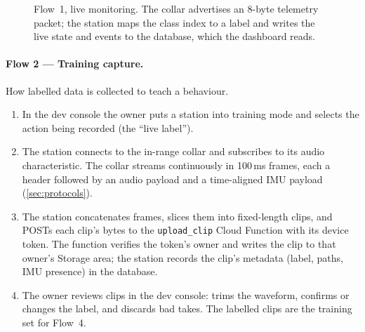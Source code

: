 \begin{figure}[ht]\centering
  \caption{Flow~1, live monitoring. The collar advertises an 8-byte telemetry packet; the station
           maps the class index to a label and writes the live state and events to the database, which
           the dashboard reads.}
  \label{fig:live-flow}
\end{figure}

\paragraph{Flow 2 --- Training capture.}
How labelled data is collected to teach a behaviour.
\begin{enumerate}[leftmargin=1.6em,itemsep=2pt]
  \item In the dev console the owner puts a station into training mode and selects the action being
        recorded (the ``live label'').
  \item The station connects to the in-range collar and subscribes to its audio characteristic. The
        collar streams continuously in 100\,ms frames, each a header followed by an audio payload and
        a time-aligned IMU payload (\cref{sec:protocols}).
  \item The station concatenates frames, slices them into fixed-length clips, and POSTs each clip's
        bytes to the \texttt{upload\_clip} Cloud Function with its device token. The function
        verifies the token's owner and writes the clip to that owner's Storage area; the station
        records the clip's metadata (label, paths, IMU presence) in the database.
  \item The owner reviews clips in the dev console: trims the waveform, confirms or changes the label,
        and discards bad takes. The labelled clips are the training set for Flow~4.
\end{enumerate}

